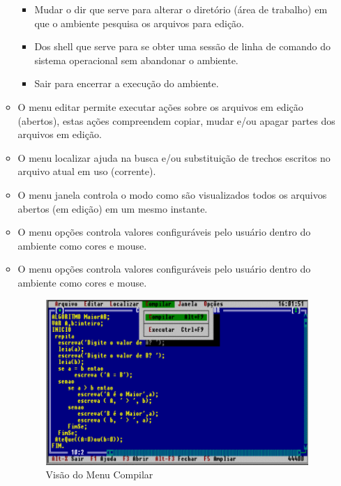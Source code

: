\begin{enumerate}
\begin{itemize}
\begin{itemize}
  \item Mudar o dir que serve para alterar o diretório (área de trabalho) em que
  o ambiente pesquisa os arquivos para edição.

  \item Dos shell que serve para se obter uma sessão de linha de comando do
  sistema operacional sem abandonar o ambiente.

  \item Sair para encerrar a execução do ambiente.

\end{itemize}

  \item O menu editar permite executar ações sobre os arquivos em edição
  (abertos), estas ações compreendem copiar, mudar e/ou apagar partes dos
  arquivos em edição.

  \item O menu localizar ajuda na busca e/ou substituição de trechos escritos no
  arquivo atual em uso (corrente).

  \item O menu janela controla o modo como são visualizados todos os arquivos
  abertos (em edição) em um mesmo instante.

  \item O menu opções controla valores configuráveis pelo usuário dentro do
  ambiente como cores e mouse.

  \item O menu opções controla valores configuráveis pelo usuário dentro do
  ambiente como cores e mouse.

  \begin{figure}[h]
    \centering
    \includegraphics{figures/portugolplus-compilar.pdf}
    \caption{Visão do Menu Compilar}\label{fig:portugolplus-compilar}
  \end{figure}


\end{itemize}
\end{enumerate}
